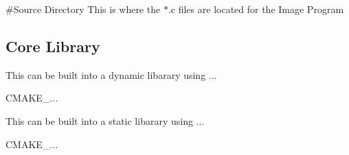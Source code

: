 \#\+Source Directory This is where the $\ast$.c files are located for the Image Program

\subsection*{Core Library}

This can be built into a dynamic libarary using ...


\begin{DoxyCode}
CMAKE\_...
\end{DoxyCode}
 This can be built into a static libarary using ...


\begin{DoxyCode}
CMAKE\_...
\end{DoxyCode}
 